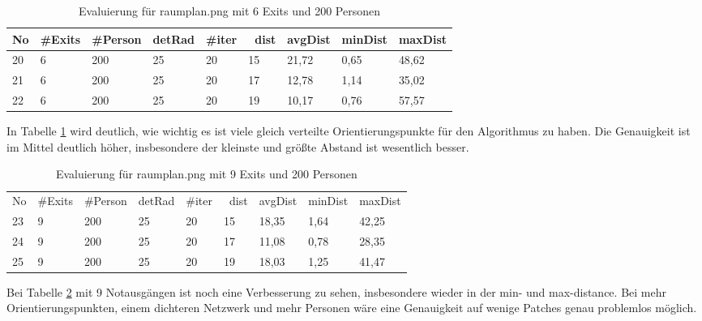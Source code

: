 \begin{table}[h]
\begin{tabular}{|l|l|l|l|l|l|l|l|l|}
\hline
No & \#Exits & \#Person & detRad & \#iter & ~dist & avgDist & minDist & maxDist \\ \hline
20 & 6       & 200      & 25     & 20     & 15    & 21,72   & 0,65    & 48,62   \\ \hline
21 & 6       & 200      & 25     & 20     & 17    & 12,78   & 1,14    & 35,02   \\ \hline
22 & 6       & 200      & 25     & 20     & 19    & 10,17   & 0,76    & 57,57   \\ \hline
\end{tabular}
\caption{Evaluierung für raumplan.png mit 6 Exits und 200 Personen}
\label{fig:eva04}
\end{table}

In Tabelle \ref{fig:eva04} wird deutlich, wie wichtig es ist viele gleich verteilte Orientierungspunkte für den Algorithmus zu haben. Die Genauigkeit ist im Mittel deutlich höher, insbesondere der kleinste und größte Abstand ist wesentlich besser.

\begin{table}[h]
\begin{tabular}{l|l|l|l|l|l|l|l|l|}
\cline{2-9}
No & \#Exits & \#Person & detRad & \#iter & ~dist & avgDist & minDist & maxDist \\ \cline{2-9} 
23 & 9       & 200      & 25     & 20     & 15    & 18,35   & 1,64    & 42,25   \\ \cline{2-9} 
24 & 9       & 200      & 25     & 20     & 17    & 11,08   & 0,78    & 28,35   \\ \cline{2-9} 
25 & 9       & 200      & 25     & 20     & 19    & 18,03   & 1,25    & 41,47   \\ \cline{2-9} 
\end{tabular}
\caption{Evaluierung für raumplan.png mit 9 Exits und 200 Personen}
\label{fig:eva05}
\end{table}

Bei Tabelle \ref{fig:eva05} mit 9 Notausgängen ist noch eine Verbesserung zu sehen, insbesondere wieder in der min- und max-distance. Bei mehr Orientierungspunkten, einem dichteren Netzwerk und mehr Personen wäre eine Genauigkeit auf wenige Patches genau problemlos möglich.